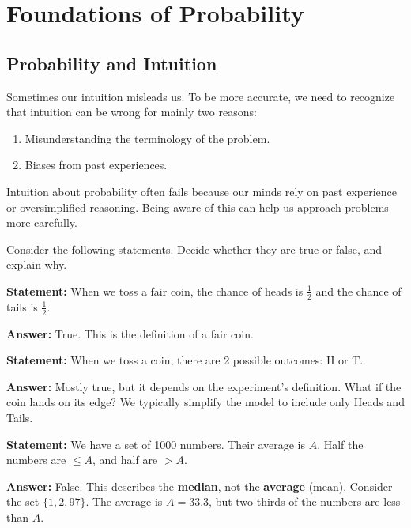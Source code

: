 \chapter{Foundations of Probability}
\label{ch:foundations}

\section{Probability and Intuition}

Sometimes our intuition misleads us. To be more accurate, we need to recognize that intuition can be wrong for mainly two reasons:

\begin{enumerate}
    \item Misunderstanding the terminology of the problem.
    \item Biases from past experiences.
\end{enumerate}

\begin{intuition}
Intuition about probability often fails because our minds rely on past experience or oversimplified reasoning. Being aware of this can help us approach problems more carefully.
\end{intuition}

\begin{problem}
Consider the following statements. Decide whether they are true or false, and explain why.
\end{problem}

\begin{eg}
\textbf{Statement:} When we toss a fair coin, the chance of heads is $\frac{1}{2}$ and the chance of tails is $\frac{1}{2}$.  

\textbf{Answer:} True. This is the definition of a fair coin.
\end{eg}

\begin{eg}
\textbf{Statement:} When we toss a coin, there are 2 possible outcomes: H or T.  

\textbf{Answer:} Mostly true, but it depends on the experiment's definition. What if the coin lands on its edge? We typically simplify the model to include only Heads and Tails.
\end{eg}

\begin{eg}
\textbf{Statement:} We have a set of 1000 numbers. Their average is $A$. Half the numbers are $\leq A$, and half are $> A$.  

\textbf{Answer:} False. This describes the \textbf{median}, not the \textbf{average} (mean). Consider the set $\{1, 2, 97\}$. The average is $A=33.3$, but two-thirds of the numbers are less than $A$.
\end{eg}

